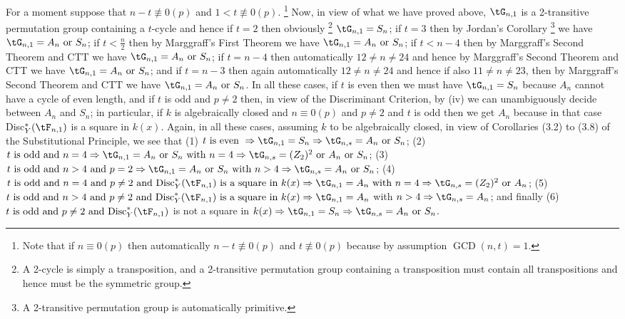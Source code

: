 For a moment suppose that $n-t\not\equiv 0(p)$ and 
$1<t\not\equiv 0(p)$.
\footnote{Note that if $n\equiv 0(p)$ then automatically 
$n-t\not\equiv 0(p)$
and $t\not\equiv 0(p)$ because by assumption %
$\operatorname{GCD}(n,t)=1$.}
Now, in view of what we have proved above, $\tG_{n,1}$ is 
a 2-transitive
permutation group containing a $t$-cycle and hence if 
$t=2$ then obviously
\footnote{A 2-cycle is simply a transposition, and a 
2-transitive 
permutation group containing a transposition must contain 
all transpositions 
and hence must be the symmetric group.} 
$\tG_{n,1}=S_n$; if $t=3$ then by Jordan's Corollary 
\footnote{A 2-transitive permutation group is 
automatically primitive.}
we have $\tG_{n,1}=A_n\text{ or }S_n$; if $t<\frac n2$ 
then by Marggraff's
First Theorem we have $\tG_{n,1}=A_n\text{ or }S_n$; if 
$t<n-4$ then by 
Marggraff's Second Theorem and CTT we have 
$\tG_{n,1}=A_n\text{ or }S_n$; 
if $t=n-4$ 
then automatically
$12\ne n\ne 24$ and hence by 
Marggraff's Second Theorem and CTT we have 
$\tG_{n,1}=A_n\text{ or }S_n$; 
and if $t=n-3$ 
then again automatically
$12\ne n\ne 24$ and
hence if also
$11\ne n\ne 23$, then by 
Marggraff's Second Theorem and CTT we have 
$\tG_{n,1}=A_n\text{ or }S_n$. 
In all these cases, 
if $t$ is even then we must have $\tG_{n,1}=S_n$ because 
$A_n$ cannot have a 
cycle of even length, and if $t$ is odd and $p\ne 2$ then, 
in view of the 
Discriminant Criterion, by (iv) we can unambiguously 
decide between $A_n$ and 
$S_n$; in particular, if $k$ is algebraically closed and 
$n\equiv 0(p)$ and 
$p\ne 2$ and $t$ is odd then we get $A_n$ because in that 
case 
Disc$^*_Y(\tF_{n,1})$ is a square in $k(x)$. 
Again, in all these cases,
assuming $k$ to be algebraically closed, in view of 
Corollaries (3.2) to (3.8)
of the Substitutional Principle, we see that (1) $t\text{ 
is even }\Rightarrow
\tG_{n,1}=S_n\Rightarrow\tG_{n,s}=A_n\text{ or }S_n$; (2)
$t\text{ is odd and }n=4\Rightarrow\tG_{n,1}=A_n\text{ or 
}S_n\text{ with }n=4
\Rightarrow\tG_{n,s} =(Z_2)^2\text{ or }A_n\text{ or 
}S_n$; (3)
$t\text{ is odd and }n>4\text{ and }p=2\Rightarrow\tG_{n,1}
=A_n\text{ or }S_n\text{ with }n>4 \Rightarrow\tG_{n,s} 
=A_n\text{ or }S_n$;
(4) $t\text{ is odd and }n=4\text{ and }p\ne 2\text{ and 
Disc}^*_Y(\tF_{n,1})
\text{ is a square in }
k(x)\Rightarrow\tG_{n,1}=A_n\text{ with }n=4
\Rightarrow\tG_{n,s} =(Z_2)^2\text{ or }A_n$;
(5) $t\text{ is odd and }n>4\text{ and }p\ne 2\text{ and 
Disc}^*_Y(\tF_{n,1})
\text{ is a square in }k(x)\Rightarrow\tG_{n,1}
=A_n$ with $n>4\Rightarrow\tG_{n,s} =A_n$; and finally
(6) $t\text{ is odd and }p\ne 2\text{ and 
Disc}^*_Y(\tF_{n,1})$
is not a square in $k(x)\Rightarrow\tG_{n,1}
=S_n\Rightarrow\tG_{n,s} =A_n\text{ or }S_n$.


